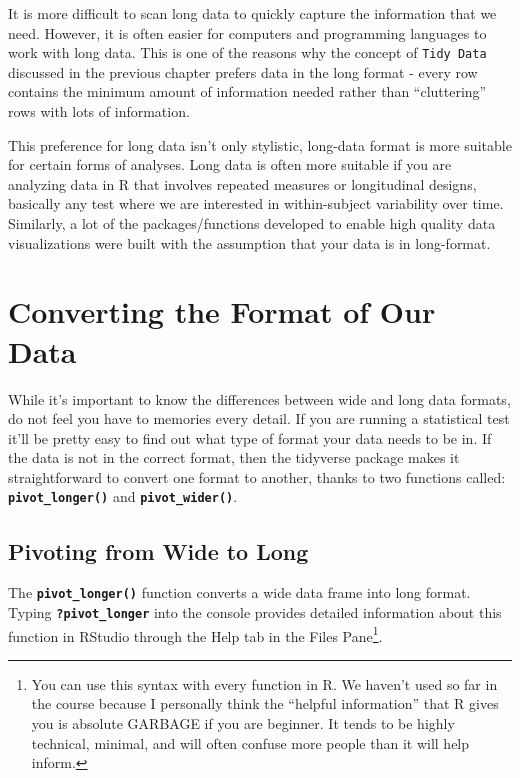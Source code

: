 \documentclass[
]{book}
\begin{document}
It is more difficult to scan long data to quickly capture the information that we need. However, it is often easier for computers and programming languages to work with long data. This is one of the reasons why the concept of \texttt{Tidy\ Data} discussed in the previous chapter prefers data in the long format - every row contains the minimum amount of information needed rather than ``cluttering'' rows with lots of information.

This preference for long data isn't only stylistic, long-data format is more suitable for certain forms of analyses. Long data is often more suitable if you are analyzing data in R that involves repeated measures or longitudinal designs, basically any test where we are interested in within-subject variability over time. Similarly, a lot of the packages/functions developed to enable high quality data visualizations were built with the assumption that your data is in long-format.

\hypertarget{converting-the-format-of-our-data}{%
\section{Converting the Format of Our Data}\label{converting-the-format-of-our-data}}

While it's important to know the differences between wide and long data formats, do not feel you have to memories every detail. If you are running a statistical test it'll be pretty easy to find out what type of format your data needs to be in. If the data is not in the correct format, then the tidyverse package makes it straightforward to convert one format to another, thanks to two functions called: \textbf{\texttt{pivot\_longer()}} and \textbf{\texttt{pivot\_wider()}}.

\hypertarget{pivoting-from-wide-to-long}{%
\subsection{Pivoting from Wide to Long}\label{pivoting-from-wide-to-long}}

The \textbf{\texttt{pivot\_longer()}} function converts a wide data frame into long format. Typing \textbf{\texttt{?pivot\_longer}} into the console provides detailed information about this function in RStudio through the Help tab in the Files Pane\footnote{You can use this syntax with every function in R. We haven't used so far in the course because I personally think the ``helpful information'' that R gives you is absolute GARBAGE if you are beginner. It tends to be highly technical, minimal, and will often confuse more people than it will help inform.}.
\end{document}
